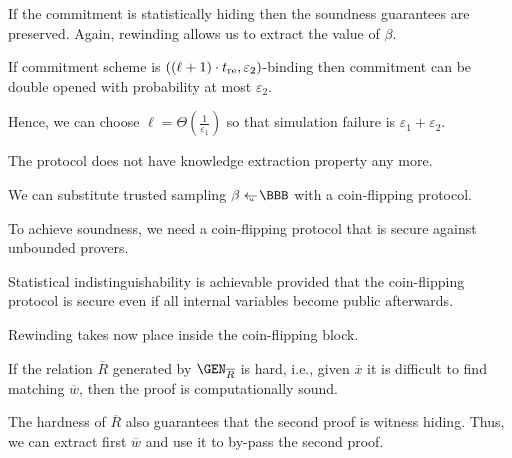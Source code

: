 \documentclass[landscape,dvips,footrule]{foils}
\begin{document}



If the commitment is statistically hiding then the soundness
guarantees are preserved. Again, rewinding allows us to extract the
value of $\beta$.
\begin{triangles}
\item If commitment scheme is
  $((\ell+1)\cdot t_{\mathrm{re}},\varepsilon_2)$-binding then commitment can be
  double opened with probability at most $\varepsilon_2$.
\item Hence, we can choose $\ell=\Theta(\frac{1}{\varepsilon_1})$ so
  that simulation failure is $\varepsilon_1+\varepsilon_2$.
\item The protocol does not have knowledge extraction property any more.
\end{triangles}



We can substitute trusted sampling $\beta\getsu\BBB$ with a
coin-flipping protocol.

\begin{triangles}
\item To achieve soundness, we need a coin-flipping protocol that is
  secure against unbounded provers.
\item Statistical indistinguishability is achievable provided that the
  coin-flipping protocol is secure even if all internal variables
  become public afterwards.
\item Rewinding takes now place inside the coin-flipping block.
\end{triangles}



If the relation $\overline{R}$ generated by $\GEN_{\overline{R}}$ is
hard, i.e., given $\overline{x}$ it is difficult to find matching
$\overline{w}$, then the proof is computationally sound.

The hardness of $\overline{R}$ also guarantees that the second proof
is witness hiding. Thus, we can extract first $\overline{w}$ and use
it to by-pass the second proof.
\end{document}

